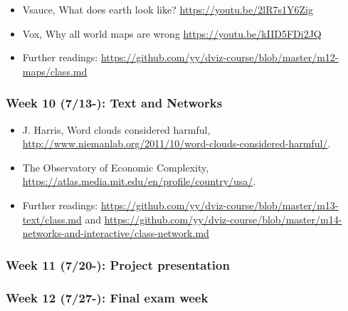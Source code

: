 \documentclass[11pt,article,oneside]{memoir} %
\begin{document}
\begin{itemize}\itemsep0em 
\item Vsauce, What does earth look like? \url{https://youtu.be/2lR7s1Y6Zig}
\item Vox, Why all world maps are wrong \url{https://youtu.be/kIID5FDi2JQ}
\item Further readings: \url{https://github.com/yy/dviz-course/blob/master/m12-maps/class.md}
\end{itemize}	
\subsubsection{Week 10 (7/13-): Text and Networks } %

\begin{itemize}\itemsep0em 
\item J. Harris, Word clouds considered harmful, \url{http://www.niemanlab.org/2011/10/word-clouds-considered-harmful/}. 
\item The Observatory of Economic Complexity, \url{https://atlas.media.mit.edu/en/profile/country/usa/}.
\item Further readings: \url{https://github.com/yy/dviz-course/blob/master/m13-text/class.md} and \url{https://github.com/yy/dviz-course/blob/master/m14-networks-and-interactive/class-network.md}
\end{itemize}	
\subsubsection{Week 11 (7/20-): Project presentation} %
\subsubsection{Week 12 (7/27-): Final exam week}%


\end{document}
